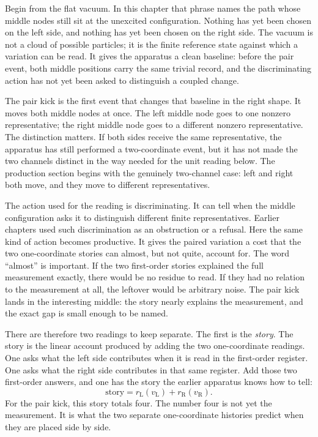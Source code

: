 Begin from the flat vacuum. In this chapter that phrase names the path whose
middle nodes still sit at the unexcited configuration. Nothing has yet been
chosen on the left side, and nothing has yet been chosen on the right side. The
vacuum is not a cloud of possible particles; it is the finite reference state
against which a variation can be read. It gives the apparatus a clean baseline:
before the pair event, both middle positions carry the same trivial record, and
the discriminating action has not yet been asked to distinguish a coupled
change.

The pair kick is the first event that changes that baseline in the right
shape. It moves both middle nodes at once. The left middle node goes to one
nonzero representative; the right middle node goes to a different nonzero
representative. The distinction matters. If both sides receive the same
representative, the apparatus has still performed a two-coordinate event, but it
has not made the two channels distinct in the way needed for the unit reading
below. The production section begins with the genuinely two-channel case: left
and right both move, and they move to different representatives.

The action used for the reading is discriminating. It can tell when the middle
configuration asks it to distinguish different finite representatives. Earlier
chapters used such discrimination as an obstruction or a refusal. Here the same
kind of action becomes productive. It gives the paired variation a cost that
the two one-coordinate stories can almost, but not quite, account for. The word
``almost'' is important. If the two first-order stories explained the full
measurement exactly, there would be no residue to read. If they had no relation
to the measurement at all, the leftover would be arbitrary noise. The pair kick
lands in the interesting middle: the story nearly explains the measurement, and
the exact gap is small enough to be named.

There are therefore two readings to keep separate. The first is the
\emph{story}. The story is the linear account produced by adding the two
one-coordinate readings. One asks what the left side contributes when it is
read in the first-order register. One asks what the right side contributes in
that same register. Add those two first-order answers, and one has the story
the earlier apparatus knows how to tell:
\[
  \text{story}
    = r_{\mathrm{L}}(v_{\mathrm{L}})
      + r_{\mathrm{R}}(v_{\mathrm{R}}).
\]
For the pair kick, this story totals four. The number four is not yet the
measurement. It is what the two separate one-coordinate histories predict when
they are placed side by side.


